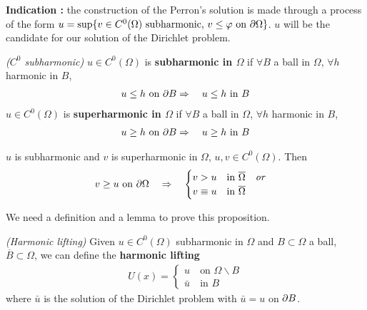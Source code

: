 \documentclass[12pt,a4paper]{article}
\begin{document}
\textbf{Indication :} the construction of the Perron's solution is made through a process of the form $u = \sup \{ v\in C^0(\Omega) \text{ subharmonic, } v\leq \varphi \text{ on } \partial \Omega \}$. $u$ will be the candidate for our solution of the Dirichlet problem.
\s

 \emph{($C^0$ subharmonic)} $u\in C^0(\Omega)$ is \textbf{subharmonic in $\Omega$} if $\forall B$ a ball in $\Omega$, $\forall h$ harmonic in $B$,
\begin{align*}
u\leq h \text{ on }\partial B \Rightarrow \quad u\leq h \text{ in } B
\end{align*}
$u \in C^0(\Omega)$ is \textbf{superharmonic in $\Omega$} if $\forall B$ a ball in $\Omega$, $\forall h$ harmonic in $B$,
\begin{align*}
u\geq h \text{ on }\partial B \Rightarrow \quad u\geq h \text{ in } B
\end{align*}
\s

 $u$ is subharmonic and $v$ is superharmonic in $\Omega$, $u, v\in C^0(\Omega)$. Then
\begin{align*}
v\geq u \text{ on } \partial \Omega \quad \Rightarrow \quad \begin{cases}
v > u \quad \text{in } \overline{\Omega} \quad \emph{or} \\
v \equiv u \quad \text{in } \overline{\Omega}
\end{cases}
\end{align*}
\s

We need a definition and a lemma to prove this proposition.
\s

 \emph{(Harmonic lifting)} Given $u\in C^0(\Omega)$ subharmonic in $\Omega$ and $B\subset \Omega$ a ball, $\overline{B} \subset \Omega$, we can define the \textbf{harmonic lifting}
\begin{align*}
U(x) = \begin{cases}
u \quad \text{on } \Omega \backslash B \\
\bar{u} \quad \text{in } B
\end{cases}
\end{align*}
where $\bar{u}$ is the solution of the Dirichlet problem with $\bar{u} = u$ on $\partial B$.
\s
\end{document}
